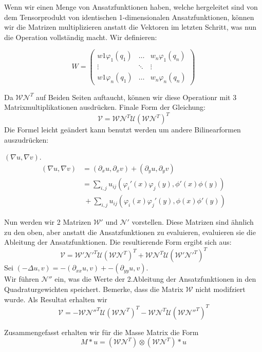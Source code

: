 Wenn wir einen Menge von Ansatzfunktionen haben, welche hergeleitet sind von dem Tensorprodukt von identischen 1-dimensionalen Ansatzfunktionen, können wir die Matrizen multiplizieren anstatt die Vektoren im letzten Schritt, was nun die Operation vollständig macht. Wir definieren:

\[W=
\begin{pmatrix}
w1 \varphi_1(q_1) & \hdots & w_n \varphi_1(q_n) \\
\vdots & \ddots & \vdots \\
w1 \varphi_n(q_1) & \hdots & w_n \varphi_n(q_n)
\end{pmatrix}
\]

Da  $\mathcal{W} \mathcal{N}^T$ auf Beiden Seiten auftaucht, können wir diese Operationr mit 3 Matrixmultiplikationen ausdrücken. Finale Form der Gleichung:
\begin{equation}
\mathcal{V} = \mathcal{W} \mathcal{N}^T \mathcal{U} (\mathcal{W} \mathcal{N}^T)^T
\end{equation}
Die Formel leicht geändert kann benutzt werden um andere Bilinearformen auszudrücken:

$(\nabla u, \nabla v)$.
\begin{align}
(\nabla u, \nabla v) &=(\partial_x u,\partial_x v) + (\partial_y u,\partial_y v) \\
					   &=\sum_{i,j} u_{ij} (\varphi_i'(x)\varphi_j(y),\phi'(x)\phi(y)) \\
					   & \ + \sum_{i,j} u_{ij} (\varphi_i(x)\varphi_j'(y),\phi(x)\phi'(y))
\end{align}

Nun werden wir 2 Matrizen  $\mathcal{W}'$ und $\mathcal{N}'$ vorstellen.
Diese Matrizen sind ähnlich zu den oben, aber anstatt die Ansatzfunktionen zu evaluieren, evaluieren sie die Ableitung der Ansatzfunktionen. Die resultierende Form ergibt sich aus:
\[\mathcal{V}=\mathcal{W}' \mathcal{N}'^T \mathcal{U} (\mathcal{W} \mathcal{N}^T)^T +\mathcal{W} \mathcal{N}^T \mathcal{U} (\mathcal{W}' \mathcal{N}'^T)^T\]
Sei $(-\Delta u, v)=-(\partial_{xx} u,v) + -(\partial_{yy} u,v)$.\\
Wir führen $\mathcal{N}''$ ein, was die Werte der 2.Ableitung der Ansatzfunktionen in den Quadraturgewichten speichert. Bemerke, dass die Matrix $\mathcal{W}$ nicht modifziert wurde. Als Resultat erhalten wir
\[\mathcal{V}=-\mathcal{W} \mathcal{N}''^T \mathcal{U} (\mathcal{W} \mathcal{N}^T)^T -\mathcal{W} \mathcal{N}^T \mathcal{U} (\mathcal{W} \mathcal{N}''^T)^T\]


Zusammengefasst erhalten wir für die Masse Matrix die Form
\begin{equation}
M*u = (\mathcal{W} \mathcal{N}^{T}) \otimes (\mathcal{W} \mathcal{N}^{T})*u
\end{equation}

